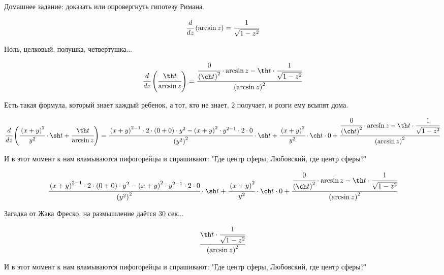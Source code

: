 Домашнее задание: доказать или опровергнуть гипотезу Римана.


\begin{dmath}
 \cfrac{d}{d z} \left( \arcsin z \right) = \cfrac{1}{\sqrt{  1 - z^{2}}} 
\end{dmath}


Ноль, целковый, полушка, четвертушка...


\begin{dmath}
 \cfrac{d}{d z} \left( \cfrac{\th t}{\arcsin z} \right) = \cfrac{\cfrac{0}{\left(\ch t\right)^{2}} \cdot \arcsin z - \th t \cdot \cfrac{1}{\sqrt{  1 - z^{2}}}}{\left(\arcsin z\right)^{2}} 
\end{dmath}


Есть такая формула, который знает каждый ребенок, а тот, кто не знает, 2 получает, и розги ему всыпят дома.


\begin{dmath}
 \cfrac{d}{d z} \left( \cfrac{\left(x + y\right)^{2}}{y^{2}} \cdot \sh t + \cfrac{\th t}{\arcsin z} \right) = \cfrac{\left(x + y\right)^{2 - 1} \cdot 2 \cdot \left(0 + 0\right) \cdot y^{2} - \left(x + y\right)^{2} \cdot y^{2 - 1} \cdot 2 \cdot 0}{\left(y^{2}\right)^{2}} \cdot \sh t + \cfrac{\left(x + y\right)^{2}}{y^{2}} \cdot \ch t \cdot 0 + \cfrac{\cfrac{0}{\left(\ch t\right)^{2}} \cdot \arcsin z - \th t \cdot \cfrac{1}{\sqrt{  1 - z^{2}}}}{\left(\arcsin z\right)^{2}} 
\end{dmath}


И в этот момент к нам вламываются пифогорейцы и спрашивают: "Где центр сферы, Любовский, где центр сферы?"


\begin{dmath}
\cfrac{\left(x + y\right)^{2 - 1} \cdot 2 \cdot \left(0 + 0\right) \cdot y^{2} - \left(x + y\right)^{2} \cdot y^{2 - 1} \cdot 2 \cdot 0}{\left(y^{2}\right)^{2}} \cdot \sh t + \cfrac{\left(x + y\right)^{2}}{y^{2}} \cdot \ch t \cdot 0 + \cfrac{\cfrac{0}{\left(\ch t\right)^{2}} \cdot \arcsin z - \th t \cdot \cfrac{1}{\sqrt{  1 - z^{2}}}}{\left(\arcsin z\right)^{2}}
\end{dmath}


Загадка от Жака Фреско, на размышление даётся 30 сек...


\begin{dmath}
\cfrac{\th t \cdot \cfrac{1}{\sqrt{  1 - z^{2}}}}{\left(\arcsin z\right)^{2}}
\end{dmath}


И в этот момент к нам вламываются пифогорейцы и спрашивают: "Где центр сферы, Любовский, где центр сферы?"


